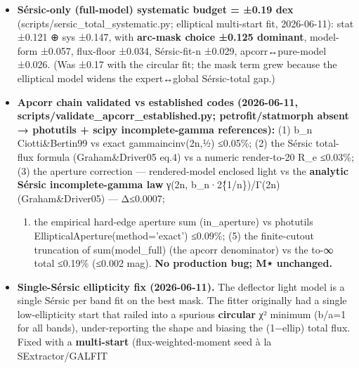 \documentclass[
]{article}
\providecommand{\tightlist}{%
  \setlength{\itemsep}{0pt}\setlength{\parskip}{0pt}}
\newcommand{\BreakablePath}[1]{{\ttfamily\sloppy #1}}
\begin{document}
\begin{itemize}
\tightlist
\item
  \textbf{Sérsic-only (full-model) systematic budget = ±0.19 dex}
  (\BreakablePath{scripts/\discretionary{}{}{}sersic\_\discretionary{}{}{}total\_\discretionary{}{}{}systematic.\discretionary{}{}{}py};
  elliptical multi-start fit, 2026-06-11): stat ±0.121 ⊕ sys ±0.147,
  with \textbf{arc-mask choice ±0.125 dominant}, model-form ±0.057,
  flux-floor ±0.034, Sérsic-fit-n ±0.029, apcorr↔pure-model ±0.026. (Was
  ±0.17 with the circular fit; the mask term grew because the elliptical
  model widens the expert↔global Sérsic-total gap.)
\item
  \textbf{Apcorr chain validated vs established codes (2026-06-11,
  \BreakablePath{scripts/\discretionary{}{}{}validate\_\discretionary{}{}{}apcorr\_\discretionary{}{}{}established.\discretionary{}{}{}py};
  petrofit/statmorph absent → photutils + scipy incomplete-gamma
  references):} (1) b\_n Ciotti\&Bertin99 vs exact
  \BreakablePath{gammaincinv(2n,½)} ≤0.05\%; (2) the Sérsic total-flux
  formula (Graham\&Driver05 eq.4) vs a numeric render-to-20 R\_e
  ≤0.03\%; (3) the aperture correction --- rendered-model enclosed light
  vs the \textbf{analytic Sérsic incomplete-gamma law}
  \BreakablePath{γ(2n, b\_\discretionary{}{}{}n·2\^\{1/\discretionary{}{}{}n\})/\discretionary{}{}{}Γ(2n)}
  (Graham\&Driver05) --- Δ≤0.0007;

  \begin{enumerate}
  \def\labelenumi{(\arabic{enumi})}
  \setcounter{enumi}{3}
  \tightlist
  \item
    the empirical hard-edge aperture sum
    (\BreakablePath{in\_\discretionary{}{}{}aperture}) vs photutils
    \BreakablePath{EllipticalAperture(method='exact')} ≤0.09\%; (5) the
    finite-cutout truncation of
    \BreakablePath{sum(model\_\discretionary{}{}{}full)} (the apcorr
    denominator) vs the to-∞ total ≤0.19\% (≤0.002 mag). \textbf{No
    production bug; M⋆ unchanged.}
  \end{enumerate}
\item
  \textbf{Single-Sérsic ellipticity fix (2026-06-11).} The deflector
  light model is a single Sérsic per band fit on the best mask. The
  fitter originally had a single low-ellipticity start that railed into
  a spurious \textbf{circular} χ² minimum (b/a=1 for all bands),
  under-reporting the shape and biasing the \BreakablePath{(1−ellip)}
  total flux. Fixed with a \textbf{multi-start} (flux-weighted-moment
  seed à la SExtractor/GALFIT


\end{itemize}
\end{document}

